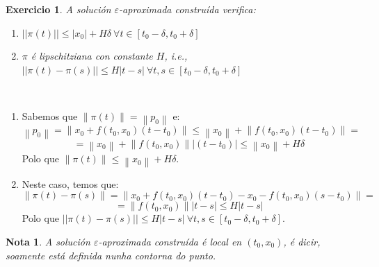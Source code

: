 \documentclass[11pt, a4paper,twoside]{article}
\makeatletter
\theoremstyle{theorem-style}  %
\renewenvironment{proof}[1][\proofname]{\par
	\pushQED{\qed}%
	\normalfont \topsep6\p@\@plus6\p@\relax
	\list{}{%
		\settowidth{\leftmargin}{\quad:\hskip\labelsep}%
		\setlength{\labelwidth}{0pt}%
		\setlength{\itemindent}{-\leftmargin}%
	}%
	\item[\hskip\labelsep\itshape#1\@addpunct{:}]\ignorespaces
}{%
	\popQED\endlist\@endpefalse
}
\theoremstyle{definition-style}
\newtheorem*{note}{Nota} %
\theoremstyle{example-style}
\newtheorem{exercise}{Exercicio}[section]
\providecommand{\norm}[1]{\left\lVert#1\right\rVert} %
\providecommand{\abs}[1]{\left\lvert#1\right\rvert} %
\makeatother
\begin{document}
\begin{exercise}
	A solución  $ \varepsilon $-aproximada construída verifica:
	\begin{enumerate}[\quad 1)]
		\item $ ||\pi(t)||\leq |x_0|+H\delta \ \forall t \in [t_0-\delta,t_0+\delta]$
		\item $ \pi $ é lipschitziana con constante $ H $, i.e., $ ||\pi(t)- \pi(s)|| \leq H |t-s| \ \forall t,s \in [t_0-\delta, t_0+\delta] $
	\end{enumerate}
\end{exercise}
\begin{proof}[Solución:]\ 
	\begin{enumerate}[\quad 1)]
		\item Sabemos que $\norm{\pi (t)} = \norm{p_0}$ e:
		\[\norm{p_0} = \norm{x_0 + f(t_0, x_0) (t - t_0)} \leq \norm{x_0} + \norm{f(t_0, x_0) (t - t_0)} = \]
		\[= \norm{x_0} + \norm{f(t_0, x_0)} \abs{(t - t_0)} \leq \norm{x_0} + H\delta\]
		Polo que $\norm{\pi (t)} \leq \norm{x_0} + H\delta$.
		\item Neste caso, temos que:
		\[\norm{\pi (t) - \pi (s)} = \norm{x_0 + f(t_0, x_0) (t - t_0) - x_0 - f(t_0, x_0) (s - t_0)} =\]
		\[= \norm{f(t_0, x_0)} \abs{t - s} \leq H\abs{t - s}\]
		Polo que $ ||\pi(t)- \pi(s)|| \leq H |t-s| \ \forall t,s \in [t_0-\delta, t_0+\delta]$.
	\end{enumerate}
\end{proof}
\begin{note}
	A solución $ \varepsilon $-aproximada construída é local en $ (t_0,x_0) $, é dicir, soamente está definida nunha contorna do punto.
\end{note}
\end{document}

